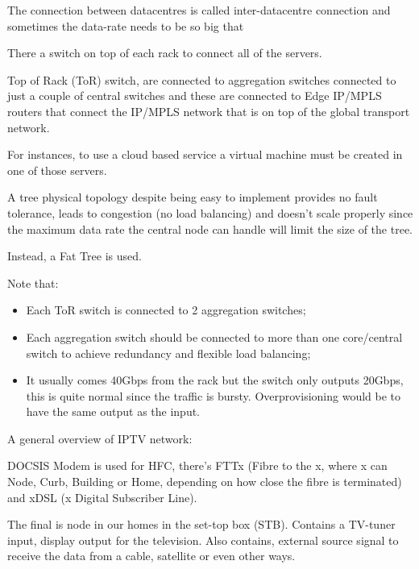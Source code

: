 The connection between datacentres is called inter-datacentre connection and sometimes the data-rate needs to be so big that 


There a switch on top of each rack to connect all of the servers. 


Top of Rack (ToR) switch, are connected to aggregation switches connected to just a couple of central switches and these are connected to Edge IP/MPLS routers that connect the IP/MPLS network that is on top of the global transport network.


For instances, to use a cloud based service a virtual machine must be created in one of those servers.


A tree physical topology despite being easy to implement provides no fault tolerance, leads to congestion (no load balancing) and doesn't scale properly since the maximum data rate the central node can handle will limit the size of the tree.



Instead, a Fat Tree is used.

Note that:
\begin{itemize}
    \item Each ToR switch is connected to 2 aggregation switches;
    \item Each aggregation switch should be connected to more than one core/central switch to achieve redundancy and flexible load balancing;
    \item It usually comes 40Gbps from the rack but the switch only outputs 20Gbps, this is quite normal since the traffic is bursty. Overprovisioning would be to have the same output as the input. 
\end{itemize}




A general overview of IPTV network:






DOCSIS Modem is used for HFC, there's FTTx (Fibre to the x, where x can Node, Curb, Building or Home, depending on how close the fibre is terminated) and xDSL (x Digital Subscriber Line).




The final is node in our homes in the set-top box (STB). Contains a TV-tuner input, display output for the television. Also contains, external source signal to receive the data from a cable, satellite or even other ways.




